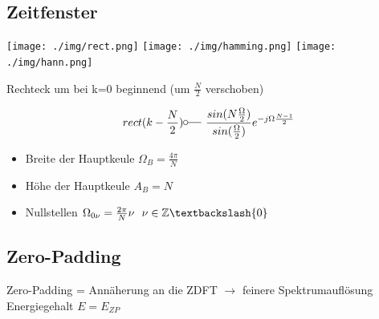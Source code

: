 \documentclass[10pt,a4paper]{article}
\begin{document}
\subsection{Zeitfenster}
  \begin{center}
      \texttt{[image: ./img/rect.png]}
      \texttt{[image: ./img/hamming.png]}
      \texttt{[image: ./img/hann.png]}
  \end{center}
  Rechteck um bei k=0 beginnend (um $\frac{N}{2}$ verschoben)
  \begin{mdframed}[style=exercise]
    \begin{align}
        rect(k-\frac{N}{2}) \fourier \frac{sin(N\frac{\Omega}{2})}{sin(\frac{\Omega}{2})} e^{-j\Omega\frac{N-1}{2}}
    \end{align}
  \end{mdframed}
  \begin{itemize}
    \item Breite der Hauptkeule $\Omega_B = \frac{4\pi}{N}$
    \item Höhe der Hauptkeule $A_B = N$
    \item Nullstellen $\Omega_{0\nu} = \frac{2\pi}{N}\nu \ \ \nu \in\mathbb{Z} \textbackslash\{0\}$
  \end{itemize}
\subsection{Zero-Padding}
Zero-Padding = Annäherung an die ZDFT $\rightarrow$ feinere Spektrumauflösung Energiegehalt $E = E_{ZP}$ \\
\end{document}
